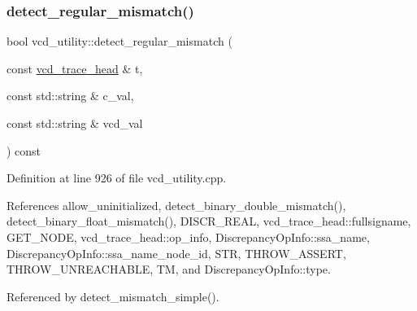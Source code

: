 \subsubsection{\texorpdfstring{detect\+\_\+regular\+\_\+mismatch()}{detect\_regular\_mismatch()}}
{\footnotesize\ttfamily bool vcd\+\_\+utility\+::detect\+\_\+regular\+\_\+mismatch (\begin{DoxyParamCaption}\item[{const \hyperlink{structvcd__trace__head}{vcd\+\_\+trace\+\_\+head} \&}]{t,  }\item[{const std\+::string \&}]{c\+\_\+val,  }\item[{const std\+::string \&}]{vcd\+\_\+val }\end{DoxyParamCaption}) const\hspace{0.3cm}{\ttfamily [protected]}}



Definition at line 926 of file vcd\+\_\+utility.\+cpp.



References allow\+\_\+uninitialized, detect\+\_\+binary\+\_\+double\+\_\+mismatch(), detect\+\_\+binary\+\_\+float\+\_\+mismatch(), D\+I\+S\+C\+R\+\_\+\+R\+E\+AL, vcd\+\_\+trace\+\_\+head\+::fullsigname, G\+E\+T\+\_\+\+N\+O\+DE, vcd\+\_\+trace\+\_\+head\+::op\+\_\+info, Discrepancy\+Op\+Info\+::ssa\+\_\+name, Discrepancy\+Op\+Info\+::ssa\+\_\+name\+\_\+node\+\_\+id, S\+TR, T\+H\+R\+O\+W\+\_\+\+A\+S\+S\+E\+RT, T\+H\+R\+O\+W\+\_\+\+U\+N\+R\+E\+A\+C\+H\+A\+B\+LE, TM, and Discrepancy\+Op\+Info\+::type.



Referenced by detect\+\_\+mismatch\+\_\+simple().

